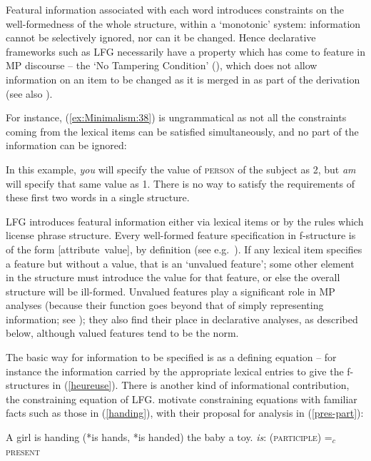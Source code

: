 \documentclass[output=paper,hidelinks]{langscibook}
\begin{document}
Featural information associated with each word introduces constraints
on the well-formed\-ness of the whole structure, within a `monotonic'
system: information cannot be selectively ignored, nor can it be
changed. Hence declarative frameworks such as LFG necessarily have a
property which has come to feature in MP discourse -- the `No
Tampering Condition' (\citealp{chomsky07}), which does not allow
information on an item to be changed as it is merged in as part of the
derivation (see also ).

For instance, (\ref{ex:Minimalism:38}) is ungrammatical as not all the constraints
coming from the lexical items can be satisfied simultaneously, and no
part of the information can be ignored:

\label{ex:Minimalism:38}
\z

In this example, \textit{you} will specify the value of
\textsc{person} of the subject as 2, but \textit{am} will specify that
same value as 1. There is no way to satisfy the requirements of these
first two words in a single structure.

LFG introduces featural information either via lexical items or by the
rules which license phrase structure. Every well-formed feature
specification in f-struc\-ture is of the form \mbox{\textsc[attribute value]}, by
definition (see e.g.~\citealp[181--182]{kaplanbresnan82}). If any
lexical item specifies a feature but without a value, that is an
`unvalued feature'; some other element in the structure must introduce
the value for that feature, or else the overall structure will be
ill-formed. Unvalued features play a significant role in MP analyses
(because their function goes beyond that of simply representing
information; see ); they also find
their place in declarative analyses, as described below, although
valued features tend to be the norm.

The basic way for information to be specified is as a defining
equation -- for instance the information carried by the appropriate
lexical entries to give the f-structures in (\ref{heureuse}). There is
another kind of informational contribution, the constraining equation
of LFG. \citet[207--209]{kaplanbresnan82} motivate constraining
equations with familiar facts such as those in (\ref{handing}), with their
proposal for analysis in (\ref{pres-part}):

\ea\label{handing}
A girl is handing (*is hands, *is handed) the baby a toy.
\z
%
\ea\label{pres-part}
\textit{is}:\; (\UP\XCOMP\textsc{participle}) {=$_c$} \textsc{present}
\z
\end{document}
